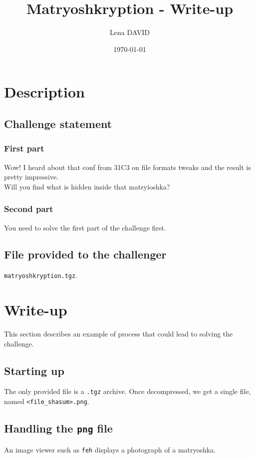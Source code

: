 \documentclass[12pt,a4paper]{article}
\author{Lena DAVID}
\title{Matryoshkryption - Write-up}
\date{\today}
\begin{document}
\maketitle
\vspace{4em}

\section{Description}
    \subsection{Challenge statement}
        \subsubsection{First part}
    Wow! I heard about that conf from 31C3 on file formats tweaks and the result
    is pretty impressive.\\

    Will you find what is hidden inside that matryioshka?

        \subsubsection{Second part}
    You need to solve the first part of the challenge first.

    \subsection{File provided to the challenger}
        \texttt{matryoshkryption.tgz}.

\section{Write-up}
    This section describes an example of process that could lead to solving the
    challenge.\\

    \subsection{Starting up}
    The only provided file is a \texttt{.tgz} archive.
    Once decompressed, we get a single file, named \texttt{<file\_shasum>.png}.

    \subsection{Handling the \texttt{png} file}
    An image viewer such as \texttt{feh} displays a photograph of a matryoshka.
    
\end{document}
